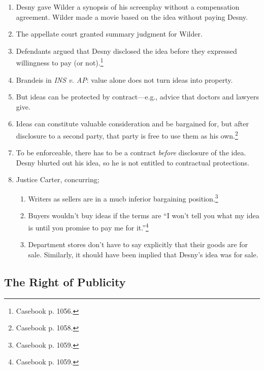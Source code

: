 \begin{enumerate}
    \item Desny gave Wilder a synopsis of his screenplay without a 
    compensation agreement. Wilder made a movie based on the idea without 
    paying Desny.
    \item The appellate court granted summary judgment for Wilder.
    \item Defendants argued that Desny disclosed the idea before they 
    expressed willingness to pay (or not).\footnote{Casebook p. 1056.}
    \item Brandeis in \emph{INS v. AP}: value alone does not turn ideas into 
    property.
    \item But ideas can be protected by contract---e.g., advice that doctors 
    and lawyers give.
    \item Ideas can constitute valuable consideration and be bargained for, 
    but after disclosure to a second party, that party is free to use them as 
    his own.\footnote{Casebook p. 1058.}
    \item To be enforceable, there has to be a contract \emph{before} 
    disclosure of the idea. Desny blurted out his idea, so he is not entitled 
    to contractual protections.
    \item Justice Carter, concurring;
    \begin{enumerate}
        \item Writers as sellers are in a mucb inferior bargaining 
        position.\footnote{Casebook p. 1059.}
        \item Buyers wouldn't buy ideas if the terms are ``I won't tell you 
        what my idea is until you promise to pay me for 
        it.''\footnote{Casebook p. 1059.}
        \item Department stores don't have to say explicitly that their goods 
        are for sale. Similarly, it should have been implied that Desny's idea 
        was for sale.
    \end{enumerate}
\end{enumerate}

\subsection{The Right of Publicity}

